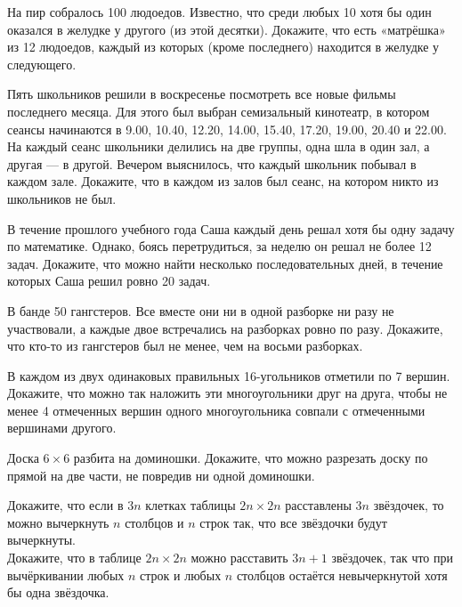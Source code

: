 \documentclass[12pt,a4paper]{article}
\begin{document}
 На пир собралось 100 людоедов. Известно, что среди любых 10 хотя бы один оказался в желудке у другого (из этой десятки). Докажите, что есть «матрёшка» из 12 людоедов, каждый из которых (кроме последнего) находится в желудке у следующего.

 Пять школьников решили в воскресенье посмотреть все новые фильмы последнего месяца. Для этого был выбран семизальный кинотеатр, в котором сеансы начинаются в 9.00, 10.40, 12.20, 14.00, 15.40, 17.20, 19.00, 20.40 и 22.00. На каждый сеанс школьники делились на две группы, одна шла в один зал, а другая --- в другой. Вечером выяснилось, что каждый школьник побывал в каждом зале. Докажите, что в каждом из залов был сеанс, на котором никто из школьников не был.

 В течение прошлого учебного года Саша каждый день решал хотя бы одну задачу по математике. Однако, боясь перетрудиться, за неделю он решал не более 12 задач. Докажите, что можно найти несколько последовательных дней, в течение которых Саша решил ровно 20 задач.

 В банде 50 гангстеров. Все вместе они ни в одной разборке ни разу не участвовали, а каждые двое встречались на разборках ровно по разу. Докажите, что кто-то из гангстеров был не менее, чем на восьми разборках.

 В каждом из двух одинаковых правильных 16-угольников отметили по 7 вершин. Докажите, что можно так наложить эти многоугольники друг на друга, чтобы не менее 4 отмеченных вершин одного многоугольника совпали с отмеченными вершинами другого.

Доска $6\times6$ разбита на доминошки. Докажите, что можно разрезать доску по прямой на две части, не повредив ни одной доминошки.

 Докажите, что если в $3n$ клетках таблицы $2n\times 2n$ расставлены $3n$ звёздочек, то можно вычеркнуть $n$ столбцов и $n$ строк
так, что все звёздочки будут вычеркнуты.\\
 Докажите, что в таблице $2n\times2n$ можно расставить $3n+1$ звёздочек, так что при вычёркивании любых $n$ строк и любых $n$ столбцов остаётся невычеркнутой хотя бы одна звёздочка.


\end{document}
